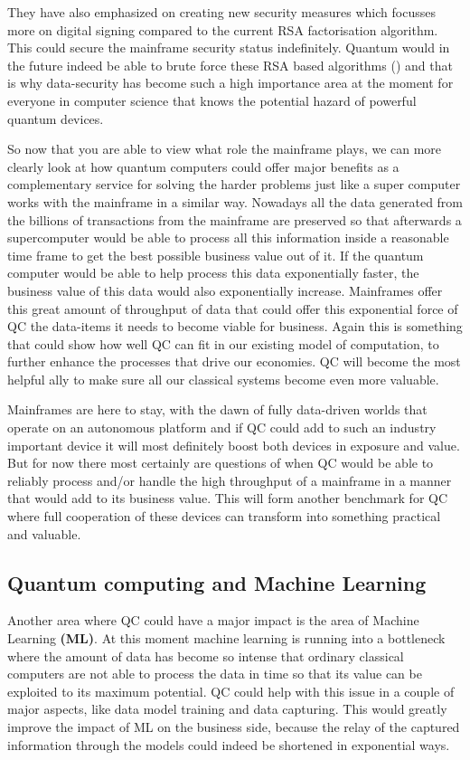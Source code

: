 They have also emphasized on creating new security measures which focusses more on digital signing compared to the current RSA factorisation algorithm. This could secure the mainframe security status indefinitely. Quantum would in the future indeed be able to brute force these RSA based algorithms (\textcite{Shor2000}) and that is why data-security has become such a high importance area at the moment for everyone in computer science that knows the potential hazard of powerful quantum devices.

So now that you are able to view what role the mainframe plays, we can more clearly look at how quantum computers could offer major benefits as a complementary service for solving the harder problems just like a super computer works with the mainframe in a similar way. Nowadays all the data generated from the billions of transactions from the mainframe are preserved so that afterwards a supercomputer would be able to process all this information inside a reasonable time frame to get the best possible business value out of it. If the quantum computer would be able to help process this data exponentially faster, the business value of this data would also exponentially increase. Mainframes offer this great amount of throughput of data that could offer this exponential force of QC the data-items it needs to become viable for business. Again this is something that could show how well QC can fit in our existing model of computation, to further enhance the processes that drive our economies. QC will become the most helpful ally to make sure all our classical systems become even more valuable.

Mainframes are here to stay, with the dawn of fully data-driven worlds that operate on an autonomous platform and if QC could add to such an industry important device it will most definitely boost both devices in exposure and value. But for now there most certainly are questions of when QC would be able to reliably process and/or handle the high throughput of a mainframe in a manner that would add to its business value. This will form another benchmark for QC where full cooperation of these devices can transform into something practical and valuable.




\subsection{Quantum computing and Machine Learning}

Another area where QC could have a major impact is the area of Machine Learning \textbf{(ML)}. At this moment machine learning is running into a bottleneck where the amount of data has become so intense that ordinary classical computers are not able to process the data in time so that its value can be exploited to its maximum potential. QC could help with this issue in a couple of major aspects, like data model training and data capturing. This would greatly improve the impact of ML on the business side, because the relay of the captured information through the models could indeed be shortened in exponential ways. \autocite{Biamonte2017}

